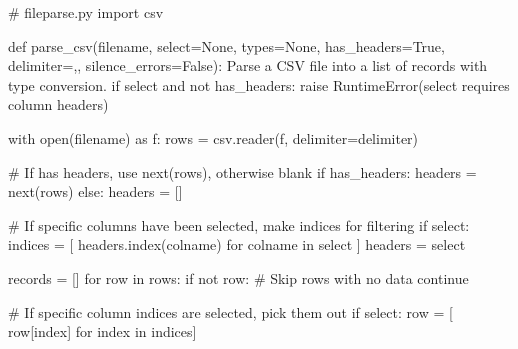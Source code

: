 \documentclass[
  letterpaper,
  DIV=11,
  numbers=noendperiod]{scrreprt}
\newenvironment{Shaded}{\begin{snugshade}}{\end{snugshade}}
\newcommand{\BuiltInTok}[1]{\textcolor[rgb]{0.00,0.46,0.62}{#1}}
\newcommand{\CommentTok}[1]{\textcolor[rgb]{0.37,0.37,0.37}{#1}}
\newcommand{\ControlFlowTok}[1]{\textcolor[rgb]{0.00,0.46,0.62}{#1}}
\newcommand{\ImportTok}[1]{\textcolor[rgb]{0.00,0.46,0.62}{#1}}
\newcommand{\KeywordTok}[1]{\textcolor[rgb]{0.00,0.46,0.62}{#1}}
\newcommand{\NormalTok}[1]{\textcolor[rgb]{0.00,0.46,0.62}{#1}}
\newcommand{\OperatorTok}[1]{\textcolor[rgb]{0.37,0.37,0.37}{#1}}
\newcommand{\PreprocessorTok}[1]{\textcolor[rgb]{0.68,0.00,0.00}{#1}}
\newcommand{\StringTok}[1]{\textcolor[rgb]{0.13,0.47,0.30}{#1}}
\newcommand{\VariableTok}[1]{\textcolor[rgb]{0.07,0.07,0.07}{#1}}
\begin{document}
\begin{Shaded}
\begin{Highlighting}[]
\CommentTok{\# fileparse.py}
\ImportTok{import}\NormalTok{ csv}

\KeywordTok{def}\NormalTok{ parse\_csv(filename, select}\OperatorTok{=}\VariableTok{None}\NormalTok{, types}\OperatorTok{=}\VariableTok{None}\NormalTok{, has\_headers}\OperatorTok{=}\VariableTok{True}\NormalTok{, delimiter}\OperatorTok{=}\StringTok{\textquotesingle{},\textquotesingle{}}\NormalTok{, silence\_errors}\OperatorTok{=}\VariableTok{False}\NormalTok{):}
    \CommentTok{\textquotesingle{}\textquotesingle{}\textquotesingle{}}
\CommentTok{    Parse a CSV file into a list of records with type conversion.}
\CommentTok{    \textquotesingle{}\textquotesingle{}\textquotesingle{}}
    \ControlFlowTok{if}\NormalTok{ select }\KeywordTok{and} \KeywordTok{not}\NormalTok{ has\_headers:}
        \ControlFlowTok{raise} \PreprocessorTok{RuntimeError}\NormalTok{(}\StringTok{\textquotesingle{}select requires column headers\textquotesingle{}}\NormalTok{)}
        
    \ControlFlowTok{with} \BuiltInTok{open}\NormalTok{(filename) }\ImportTok{as}\NormalTok{ f:}
\NormalTok{        rows }\OperatorTok{=}\NormalTok{ csv.reader(f, delimiter}\OperatorTok{=}\NormalTok{delimiter)}

        \CommentTok{\# If has headers, use next(rows), otherwise blank}
        \ControlFlowTok{if}\NormalTok{ has\_headers:}
\NormalTok{            headers }\OperatorTok{=} \BuiltInTok{next}\NormalTok{(rows)}
        \ControlFlowTok{else}\NormalTok{:}
\NormalTok{            headers }\OperatorTok{=}\NormalTok{ []}

        \CommentTok{\# If specific columns have been selected, make indices for filtering }
        \ControlFlowTok{if}\NormalTok{ select:}
\NormalTok{            indices }\OperatorTok{=}\NormalTok{ [ headers.index(colname) }\ControlFlowTok{for}\NormalTok{ colname }\KeywordTok{in}\NormalTok{ select ]}
\NormalTok{            headers }\OperatorTok{=}\NormalTok{ select}

\NormalTok{        records }\OperatorTok{=}\NormalTok{ []}
        \ControlFlowTok{for}\NormalTok{ row }\KeywordTok{in}\NormalTok{ rows:}
            \ControlFlowTok{if} \KeywordTok{not}\NormalTok{ row:     }\CommentTok{\# Skip rows with no data}
                \ControlFlowTok{continue}

            \CommentTok{\# If specific column indices are selected, pick them out}
            \ControlFlowTok{if}\NormalTok{ select:}
\NormalTok{                row }\OperatorTok{=}\NormalTok{ [ row[index] }\ControlFlowTok{for}\NormalTok{ index }\KeywordTok{in}\NormalTok{ indices]}


\end{Highlighting}
\end{Shaded}
\end{document}
